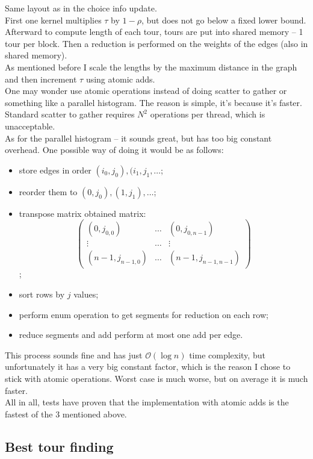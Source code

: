 \documentclass[12pt, a4paper]{article}
\begin{document}
Same layout as in the choice info update.\\
First one kernel multiplies $\tau$ by $1 - \rho$, but does not go below a fixed
lower bound.\\
Afterward to compute length of each tour, tours are put into shared memory --
1 tour per block. Then a reduction is performed on the weights of the edges
(also in shared memory).\\
As mentioned before I scale the lengths by the maximum distance in the graph
and then increment $\tau$ using atomic adds.\\
One may wonder use atomic operations instead of doing scatter to gather or
something like a parallel histogram. The reason is simple, it's because it's
faster. Standard scatter to gather requires $N^2$ operations per thread, which
is unacceptable.\\
As for the parallel histogram -- it sounds great, but has too big constant
overhead. One possible way of doing it would be as follows:
\begin{itemize}
    \item store edges in order $(i_0,j_0),(i_1,j_1,\ldots$;
    \item reorder them to $(0,j_0),(1,j_1),\ldots$;
    \item transpose matrix obtained matrix:
        \[
            \begin{pmatrix}
                (0,j_{0,0}) & \ldots & (0,j_{0,{n-1}}) \\
                \vdots & \ldots & \vdots \\
                (n-1,j_{n-1,0}) & \ldots & (n-1,j_{n-1,n-1})
            \end{pmatrix}
        \];
    \item sort rows by $j$ values;
    \item perform enum operation to get segments for reduction on each row;
    \item reduce segments and add perform at most one add per edge.
\end{itemize}
This process sounds fine and has just $\mathcal{O}(\log n)$ time complexity,
but unfortunately it has a very big constant factor, which is the reason I
chose to stick with atomic operations. Worst case is much worse, but on average
it is much faster.\\
All in all, tests have proven that the implementation with atomic adds is the
fastest of the 3 mentioned above.

\subsection*{Best tour finding}
\end{document}

